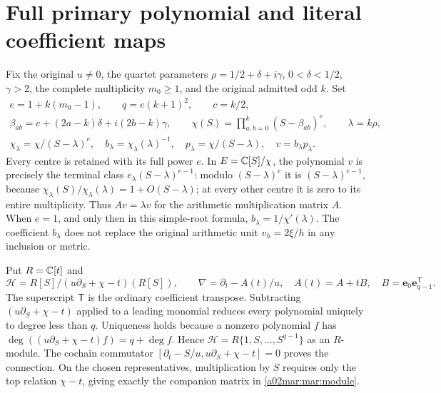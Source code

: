 \documentclass[11pt,a4paper]{article}
\begin{document}
\section{Full primary polynomial and literal coefficient maps}
Fix the original $u\ne0$, the quartet parameters
$\rho=1/2+\delta+i\gamma$, $0<\delta<1/2$, $\gamma>2$, the
complete multiplicity $m_0\ge1$, and the original admitted odd $k$.
Set
\begin{equation}\tag{MAR1}\label{a02mar:mar:objects}
 \begin{gathered}
 e=1+k(m_0-1),\qquad q=e(k+1)^2,\qquad c=k/2,\\
 \beta_{ab}=c+(2a-k)\delta+i(2b-k)\gamma,\qquad
 \chi(S)=\prod_{a,b=0}^{k}(S-\beta_{ab})^e,\qquad\lambda=k\rho,\\
 \chi_\lambda=\chi/(S-\lambda)^e,\quad
 b_\lambda=\chi_\lambda(\lambda)^{-1},\quad
 p_\lambda=\chi/(S-\lambda),\quad v=b_\lambda p_\lambda.
 \end{gathered}
\end{equation}
Every centre is retained with its full power $e$. In $E=\mathbb C[S]/\chi$,
the polynomial $v$ is precisely the terminal class
$e_\lambda(S-\lambda)^{e-1}$: modulo $(S-\lambda)^e$ it is
$(S-\lambda)^{e-1}$, because
$\chi_\lambda(S)/\chi_\lambda(\lambda)=1+O(S-\lambda)$;
at every other centre it is zero to its entire multiplicity.
Thus $A v=\lambda v$ for the arithmetic multiplication matrix $A$.
When $e=1$, and only then in this simple-root formula,
$b_\lambda=1/\chi'(\lambda)$. The coefficient $b_\lambda$ does not
replace the original arithmetic unit $v_h=2\xi/h$ in any inclusion or metric.

Put $R=\mathbb C[t]$ and
\begin{equation}\tag{MAR2}\label{a02mar:mar:module}
 \mathscr H=R[S]/(u\partial_S+\chi-t)(R[S]),\qquad
 \nabla=\partial_t-A(t)/u,
 \quad A(t)=A+tB,\quad B=\mathbf e_0\mathbf e_{q-1}^{\mathsf T}.
\end{equation}
The superscript $\mathsf T$ is the ordinary coefficient transpose.
Subtracting $(u\partial_S+\chi-t)$ applied to a leading monomial
reduces every polynomial uniquely to degree less than $q$. Uniqueness
holds because a nonzero polynomial $f$ has
$\deg((u\partial_S+\chi-t)f)=q+\deg f$. Hence
$\mathscr H=R\{1,S,\ldots,S^{q-1}\}$ as an $R$-module.
The cochain commutator
$[\partial_t-S/u,u\partial_S+\chi-t]=0$ proves the connection.
On the chosen representatives, multiplication by $S$ requires only
the top relation $\chi-t$, giving exactly the companion matrix in
\eqref{a02mar:mar:module}.
\end{document}
